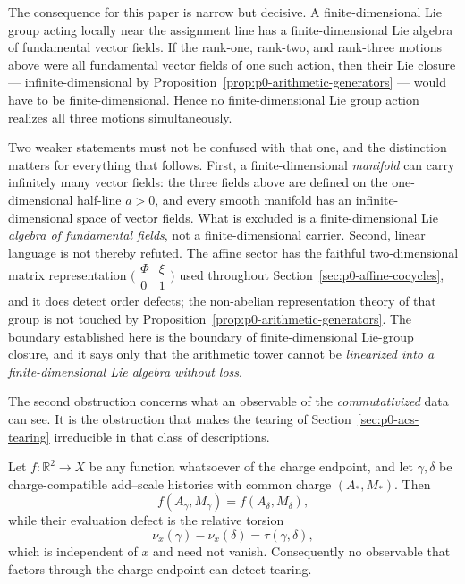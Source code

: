 The consequence for this paper is narrow but decisive.  A finite-dimensional Lie
group acting locally near the assignment line has a finite-dimensional Lie
algebra of fundamental vector fields.  If the rank-one, rank-two, and rank-three
motions above were all fundamental vector fields of one such action, then their
Lie closure — infinite-dimensional by Proposition~\ref{prop:p0-arithmetic-generators}
— would have to be finite-dimensional.  Hence no finite-dimensional Lie group
action realizes all three motions simultaneously.

Two weaker statements must not be confused with that one, and the distinction
matters for everything that follows.  First, a finite-dimensional \emph{manifold} can
carry infinitely many vector fields: the three fields above are defined on the
one-dimensional half-line $a>0$, and every smooth manifold has an
infinite-dimensional space of vector fields.  What is excluded is a
finite-dimensional Lie \emph{algebra of fundamental fields}, not a finite-dimensional
carrier.  Second, linear language is not thereby refuted.  The affine sector has
the faithful two-dimensional matrix representation
$\bigl(\begin{smallmatrix}\Phi&\xi\\0&1\end{smallmatrix}\bigr)$ used throughout
Section~\ref{sec:p0-affine-cocycles}, and it does detect order defects; the
non-abelian representation theory of that group is not touched by
Proposition~\ref{prop:p0-arithmetic-generators}.  The boundary established here
is the boundary of finite-dimensional Lie-group closure, and it says only that
the arithmetic tower cannot be \emph{linearized into a finite-dimensional Lie
algebra without loss}.

The second obstruction concerns what an observable of the \emph{commutativized} data
can see.  It is the obstruction that makes the tearing of
Section~\ref{sec:p0-acs-tearing} irreducible in that class of descriptions.

\begin{proposition}
\label{prop:p0-characters-cannot-see-tearing}
Let $f:\mathbb R^2\to X$ be any function whatsoever of the charge endpoint, and
let $\gamma,\delta$ be charge-compatible add--scale histories with common charge
$(A_*,M_*)$.  Then
\[
  f(A_\gamma,M_\gamma)=f(A_\delta,M_\delta),
\]
while their evaluation defect is the relative torsion
\[
  \nu_x(\gamma)-\nu_x(\delta)=\tau(\gamma,\delta),
\]
which is independent of $x$ and need not vanish.  Consequently no observable
that factors through the charge endpoint can detect tearing.
\end{proposition}


